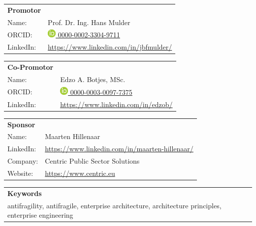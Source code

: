 \begin{minipage}{1\textwidth}
	\begin{tabular}{p{}p{}}
		\textbf{Promotor} & \\
		Name: & Prof. Dr. Ing. Hans Mulder \\
		ORCID: & \href{https://orcid.org/0000-0002-3304-9711/}{\includegraphics[scale=0.45]{images/ORCIDiD_icon} 0000-0002-3304-9711}\\
		LinkedIn: & \url{https://www.linkedin.com/in/jbfmulder/}\\
	\end{tabular}
\end{minipage}

\begin{minipage}{1\textwidth}
	\begin{tabular}{p{}p{}}
		\textbf{Co-Promotor} & \\
		Name: & Edzo A. Botjes, MSc. \\
		ORCID: & \href{https://orcid.org/0000-0003-0097-7375/}{\includegraphics[scale=0.45]{images/ORCIDiD_icon} 0000-0003-0097-7375}\\
		LinkedIn: & \url{https://www.linkedin.com/in/edzob/}\\
	\end{tabular}
\end{minipage}

\begin{minipage}{1\textwidth}
	\begin{tabular}{p{}p{}}
		\textbf{Sponsor} & \\
		Name: & Maarten Hillenaar \\
		LinkedIn:	&	\url{https://www.linkedin.com/in/maarten-hillenaar/}\\
		Company:	&	Centric Public Sector Solutions\\
		Website:	&	\url{https://www.centric.eu}
	\end{tabular}
\end{minipage}

\begin{minipage}{}
	\begin{tabular}{p{1\textwidth}}
		\textbf{Keywords} \\
		antifragility, antifragile, enterprise architecture, architecture principles, enterprise engineering \\
	\end{tabular}
\end{minipage}